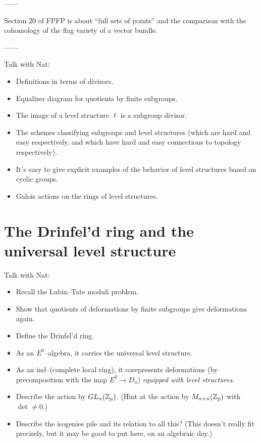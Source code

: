 ------

Section 20 of FPFP is about ``full sets of points'' and the comparison with the cohomology of the flag variety of a vector bundle.

------

Talk with Nat:
\begin{itemize}
\item Definitions in terms of divisors.
\item Equalizer diagram for quotients by finite subgroups.
\item The image of a level structure $\ell$ is a subgroup divisor.
\item The schemes classifying subgroups and level structures (which are hard and easy respectively, and which have hard and easy connections to topology respectively).
\item It's easy to give explicit examples of the behavior of level structures based on cyclic groups.
\item Galois actions on the rings of level structures.
\end{itemize}




\section{The Drinfel'd ring and the universal level structure}

Talk with Nat:
\begin{itemize}
\item Recall the Lubin--Tate moduli problem.
\item Show that quotients of deformations by finite subgroups give deformations again.
\item Define the Drinfel'd ring.
\item As an $E^0$--algebra, it carries the universal level structure.
\item As an ind--(complete local ring), it corepresents deformations (by precomposition with the map $E^0 \to D_n$) \emph{equipped with level structures}.
\item Describe the action by $GL_n(\mathbb Z_p)$. (Hint at the action by $M_{n \times n}(\mathbb Z_p)$ with $\det \ne 0$.)
\item Describe the isogenies pile and its relation to all this?  (This doesn't really fit precisely, but it may be good to put here, on an algebraic day.)
\end{itemize}











